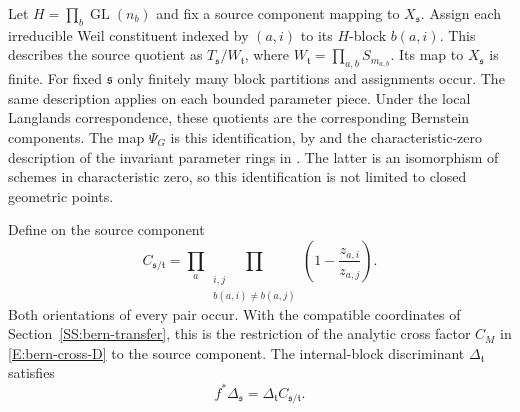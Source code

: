 \documentclass[11pt,a4paper]{amsart}
\theoremstyle{definition}
\theoremstyle{remark}
\DeclareMathOperator{\GL}{GL}
\newcommand{\grs}{\mathfrak s}
\newcommand{\grt}{\mathfrak t}
\begin{document}
Let $H=\prod_b\GL(n_b)$ and fix a source component mapping to
$X_{\grs}$. Assign each irreducible Weil constituent indexed by
$(a,i)$ to its $H$-block $b(a,i)$. This describes the source quotient as
$T_{\grs}/W_{\grt}$, where
$W_{\grt}=\prod_{a,b}S_{m_{a,b}}$. Its map to $X_{\grs}$ is finite.
For fixed $\grs$ only finitely many block partitions and assignments
occur. The same description applies on each bounded parameter piece.
Under the local Langlands correspondence, these quotients are the
corresponding Bernstein components. The map $\Psi_G$ is this
identification, by \cite[Theorem IX.7.4]{FS} and the characteristic-zero
description of the invariant parameter rings in
\cite[Theorem 1.7 and Corollary 1.8]{DHKM}. The latter is an
isomorphism of schemes in characteristic zero, so this identification
is not limited to closed geometric points.

Define on the source component
\begin{equation}\label{eq:cross-collision}
 C_{\grs/\grt}
  =\prod_a\prod_{\substack{i,j\\b(a,i)\ne b(a,j)}}
          \left(1-\frac{z_{a,i}}{z_{a,j}}\right).
\end{equation}
Both orientations of every pair occur. With the compatible
coordinates of Section~\ref{SS:bern-transfer}, this is the restriction
of the analytic cross factor $C_M$ in \eqref{E:bern-cross-D} to
the source component. The internal-block
discriminant $\Delta_{\grt}$ satisfies
\begin{equation}\label{eq:geometric-factorization}
 f^*\Delta_{\grs}=\Delta_{\grt}C_{\grs/\grt}.
\end{equation}
\end{document}

